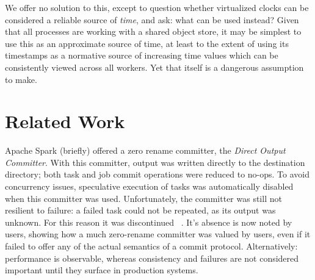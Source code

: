 \documentclass[9pt,technote]{IEEEtran}
\begin{document}
We offer no solution to this, except to question whether virtualized clocks can
be considered a reliable source of \emph{time}, and ask: what can be used instead?
Given that all processes are working with a shared object store, it may be simplest
to use this as an approximate source of time, at least to the extent of using
its timestamps as a normative source of increasing time values which can be
consistently viewed across all workers.
Yet that itself is a dangerous assumption to make.



\section{Related Work}
\label{sec:relatedWork}

Apache Spark (briefly) offered a zero rename committer,
the \emph{Direct Output Committer}.
With this committer, output was written directly to the destination directory;
both task and job commit operations were reduced to no-ops.
To avoid concurrency issues, speculative execution of tasks was automatically
disabled when this committer was used.
Unfortunately, the committer was still not resilient to failure: a failed
task could not be repeated, as its output was unknown.
For this reason it was discontinued \ \cite{DOC-SPARK-10063}.
It's absence is now noted by users, showing how a much zero-rename committer
was valued by users, even if it failed to offer any of the actual semantics
of a commit protocol.
Alternatively: performance is observable, whereas consistency and failures
are not considered important until they surface in production systems.
\end{document}

